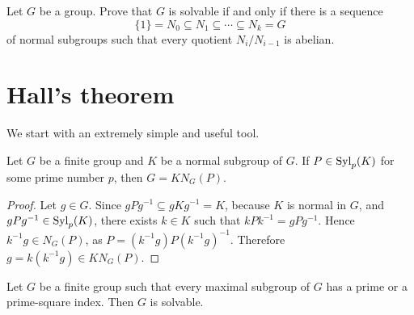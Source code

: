 \begin{exercise}
	\label{exercise:solvable}
	Let $G$ be a group. Prove that $G$ is solvable if and only if there is a sequence
	\[
		\{1\}=N_0\subseteq N_1\subseteq\cdots\subseteq N_k=G
	\]
        of normal subgroups such that every quotient 
	$N_i/N_{i-1}$ is abelian.
\end{exercise}



\section{Hall's theorem}

We start with an extremely simple and useful tool. 

\begin{lemma}
    \label{lem:Frattini_argument}
    Let $G$ be a finite group and $K$ be a normal subgroup of $G$. If 
    $P\in\mathrm{Syl}_p(K)$ for some prime number $p$, then $G=KN_G(P)$.
\end{lemma}

\begin{proof}
	Let $g\in G$. Since $gPg^{-1}\subseteq gKg^{-1}=K$, because $K$ is normal in $G$, 
	and $gPg^{-1}\in\mathrm{Syl}_p(K)$, there exists $k\in K$ such that 
	$kPk^{-1}=gPg^{-1}$. Hence $k^{-1}g\in N_G(P)$, as
	$P=(k^{-1}g)P(k^{-1}g)^{-1}$. Therefore $g=k(k^{-1}g)\in
	KN_G(P)$.
\end{proof}

\begin{theorem}[Hall]
	\label{theorem:Hall}
	Let $G$ be a finite group such that every maximal subgroup of $G$ 
        has a prime or a prime-square index. Then $G$ is solvable. 
\end{theorem}


